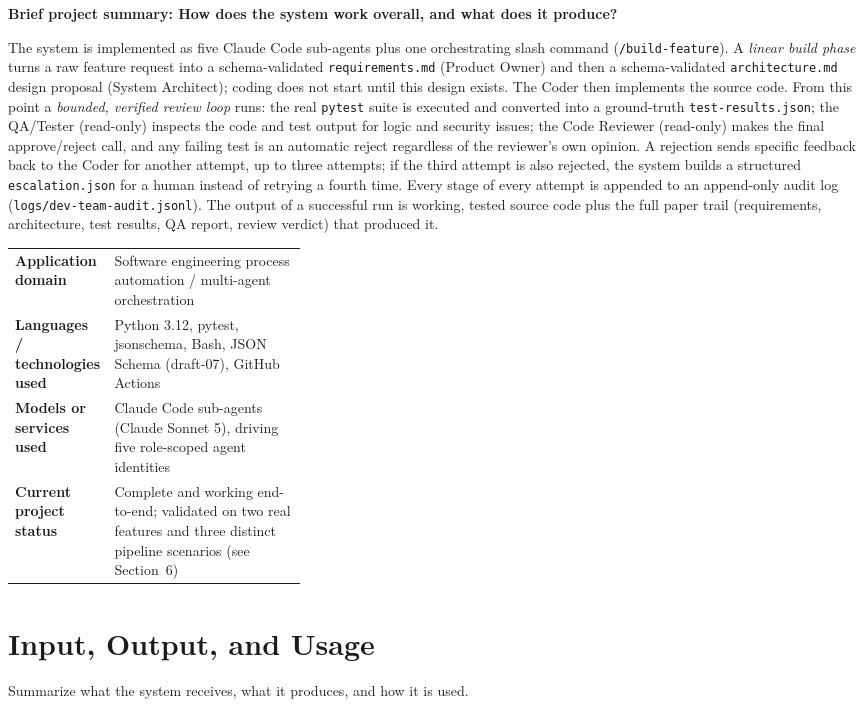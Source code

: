 \documentclass[11pt,a4paper]{article}
\newcommand{\sectionintro}[1]{\textcolor{courseGray}{\small #1}\par\vspace{2pt}}
\newcommand{\answerarea}[2]{\textbf{#1}\par\begin{answerbox}#2\end{answerbox}}
\begin{document}
\answerarea{Brief project summary: How does the system work overall, and what does it produce?}{
The system is implemented as five Claude Code sub-agents plus one orchestrating slash
command (\texttt{/build-feature}). A \emph{linear build phase} turns a raw feature
request into a schema-validated \texttt{requirements.md} (Product Owner) and then a
schema-validated \texttt{architecture.md} design proposal (System Architect); coding does
not start until this design exists. The Coder then implements the source code. From this
point a \emph{bounded, verified review loop} runs: the real \texttt{pytest} suite is
executed and converted into a ground-truth \texttt{test-results.json}; the QA/Tester
(read-only) inspects the code and test output for logic and security issues; the Code
Reviewer (read-only) makes the final approve/reject call, and any failing test is an
automatic reject regardless of the reviewer's own opinion. A rejection sends specific
feedback back to the Coder for another attempt, up to three attempts; if the third attempt
is also rejected, the system builds a structured \texttt{escalation.json} for a human
instead of retrying a fourth time. Every stage of every attempt is appended to an
append-only audit log (\texttt{logs/dev-team-audit.jsonl}). The output of a successful run
is working, tested source code plus the full paper trail (requirements, architecture, test
results, QA report, review verdict) that produced it.
}

\begin{tabularx}{\linewidth}{@{}L{0.34\linewidth}Y@{}}
\textbf{Application domain} & Software engineering process automation / multi-agent orchestration \\
\textbf{Languages / technologies used} & Python 3.12, pytest, jsonschema, Bash, JSON Schema (draft-07), GitHub Actions \\
\textbf{Models or services used} & Claude Code sub-agents (Claude Sonnet 5), driving five role-scoped agent identities \\
\textbf{Current project status} & Complete and working end-to-end; validated on two real features and three distinct pipeline scenarios (see Section~6) \\
\end{tabularx}

\section{Input, Output, and Usage}
\sectionintro{Summarize what the system receives, what it produces, and how it is used.}
\end{document}
